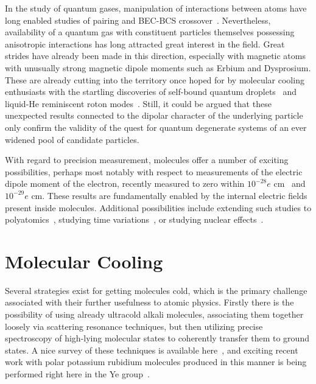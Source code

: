 In the study of quantum gases, manipulation of interactions between atoms have long enabled studies of pairing and BEC-BCS crossover~\cite{Zwierlein2003}.
Nevertheless, availability of a quantum gas with constituent particles themselves possessing anisotropic interactions has long attracted great interest in the field.
Great strides have already been made in this direction, especially with magnetic atoms with unusually strong magnetic dipole moments such as Erbium and Dysprosium. 
These are already cutting into the territory once hoped for by molecular cooling enthusiasts with the startling discoveries of self-bound quantum droplets~\cite{Schmitt2016} and liquid-He reminiscent roton modes~\cite{Chomaz2018}.
Still, it could be argued that these unexpected results connected to the dipolar character of the underlying particle only confirm the validity of the quest for quantum degenerate systems of an ever widened pool of candidate particles.

With regard to precision measurement, molecules offer a number of exciting possibilities, perhaps most notably with respect to measurements of the electric dipole moment of the electron, recently measured to zero within $10^{-28} e\text{ cm}$~\cite{Cairncross2017} and $10^{-29} e\text{ cm}$\cite{Andreev2018}.
These results are fundamentally enabled by the internal electric fields present inside molecules.
Additional possibilities include extending such studies to polyatomics~\cite{Kozyryev2017}, studying time variations~\cite{Zelevinsky2008}, or studying nuclear effects~\cite{DeMille2008}.





\section{Molecular Cooling}

Several strategies exist for getting molecules cold, which is the primary challenge associated with their further usefulness to atomic physics.
Firstly there is the possibility of using already ultracold alkali molecules, associating them together loosely via scattering resonance techniques, but then utilizing precise spectroscopy of high-lying molecular states to coherently transfer them to ground states.
A nice survey of these techniques is available here~\citep[Sec.~1.3]{HudsonThesis2006}, and exciting recent work with polar potassium rubidium molecules produced in this manner is being performed right here in the Ye group~\cite{DeMarco2019}.

